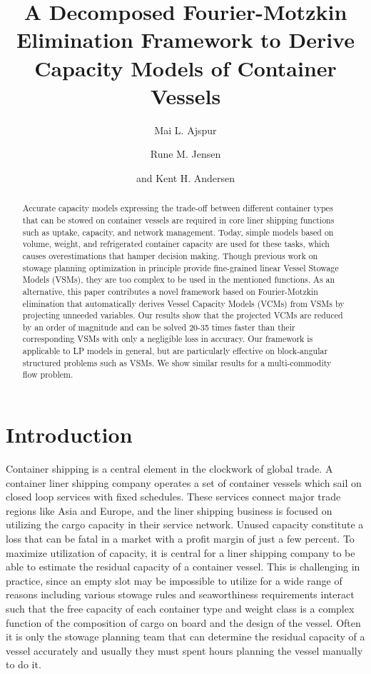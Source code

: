 \documentclass{llncs}
\begin{document}
\title{A Decomposed Fourier-Motzkin Elimination Framework to Derive Capacity Models of Container Vessels}
\author{Mai L. Ajspur \and Rune M. Jensen \and and Kent H. Andersen}

\maketitle

\begin{abstract}
Accurate capacity models expressing the trade-off between different container types that can be stowed on container vessels are required in core liner shipping functions such as uptake, capacity, and network management. Today, simple models based on volume, weight, and refrigerated container capacity are used for these tasks, which causes overestimations that hamper decision making.
Though previous work on stowage planning optimization in principle provide fine-grained linear Vessel Stowage Models (VSMs), they are too complex to be used in the mentioned functions. As an alternative, this paper contributes a novel framework based on Fourier-Motzkin elimination that automatically derives Vessel Capacity Models (VCMs) from VSMs by projecting unneeded variables. Our results show that the projected VCMs are reduced by an order of magnitude and can be solved 20-35 times faster than their corresponding VSMs with only a negligible loss in accuracy. Our framework is applicable to LP models in general, but are particularly effective on block-angular structured problems such as VSMs. We show similar results for a multi-commodity flow problem.
\end{abstract}

\section{Introduction}
Container shipping is a central element in the clockwork of global trade. A container liner shipping company operates a set of container vessels which sail on closed loop services with fixed schedules. These services connect major trade regions like Asia and Europe, and the liner shipping business is focused on utilizing the cargo capacity in their service network. Unused capacity constitute a loss that can be fatal in a market with a profit margin of just a few percent.  
To maximize utilization of capacity, it is central for a liner shipping company to be able to estimate the residual capacity of a container vessel. This is challenging in practice, since an empty slot may be impossible to utilize for a wide range of reasons including various stowage rules and seaworthiness requirements interact such that the free capacity of each container type and weight class is a complex function of the composition of cargo on board and the design of the vessel. Often it is only the stowage planning team that can determine the residual capacity of a vessel accurately and usually they must spent hours planning the vessel manually to do it. 
\end{document}
